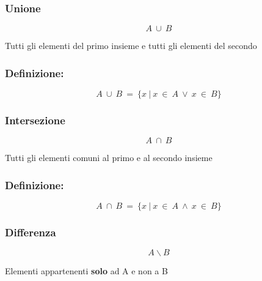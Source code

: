     \subsubsection{Unione}
        \begin{LARGE}
            \begin{equation*}
                A\ \cup\ B
            \end{equation*}
        \end{LARGE}
        Tutti gli elementi del primo insieme e tutti gli elementi del secondo\newline
        
        \subsubsection*{Definizione:}
        
        \begin{LARGE}
            \begin{equation*}
                A\ \cup\ B\ =\ \{x\ |\ x\ \in\ A\ \vee\ x\ \in\ B\}
            \end{equation*}
        \end{LARGE}

        \subsubsection{Intersezione}
        \begin{LARGE}
            \begin{equation*}
                A\ \cap\ B
            \end{equation*}
        \end{LARGE}
        Tutti gli elementi comuni al primo e al secondo insieme\newline
        
        \subsubsection*{Definizione:}
        
        \begin{LARGE}
            \begin{equation*}
                A\ \cap\ B\ =\ \{x\ |\ x\ \in\ A\ \wedge\ x\ \in\ B\}
            \end{equation*}
        \end{LARGE}

        \subsubsection{Differenza}
        \begin{LARGE}
            \begin{equation*}
                A \backslash B
            \end{equation*}
        \end{LARGE}
        Elementi appartenenti \textbf{solo} ad A e non a B\newline
        
